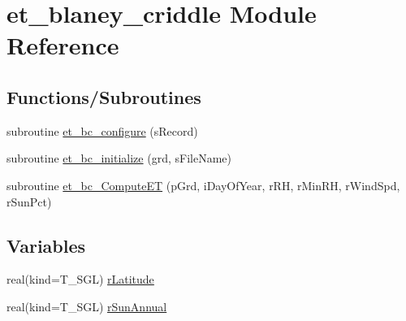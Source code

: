 \hypertarget{namespaceet__blaney__criddle}{
\section{et\_\-blaney\_\-criddle Module Reference}
\label{namespaceet__blaney__criddle}
}
\subsection*{Functions/Subroutines}
\begin{DoxyCompactItemize}
\item 
subroutine \hyperlink{namespaceet__blaney__criddle_a01ab00967e31dd22412693ce759baa17}{et\_\-bc\_\-configure} (sRecord)
\item 
subroutine \hyperlink{namespaceet__blaney__criddle_a44173fa4425711dfbec3af466c0bf584}{et\_\-bc\_\-initialize} (grd, sFileName)
\item 
subroutine \hyperlink{namespaceet__blaney__criddle_ae849a22107d6dfbdc4cf37bd66a15c25}{et\_\-bc\_\-ComputeET} (pGrd, iDayOfYear, rRH, rMinRH, rWindSpd, rSunPct)
\end{DoxyCompactItemize}
\subsection*{Variables}
\begin{DoxyCompactItemize}
\item 
real(kind=T\_\-SGL) \hyperlink{namespaceet__blaney__criddle_abf5bb3e13dbddedbfd78a519afe53b73}{rLatitude}
\item 
real(kind=T\_\-SGL) \hyperlink{namespaceet__blaney__criddle_a6cb99bb829eb26317eecf0d938c1f69a}{rSunAnnual}
\end{DoxyCompactItemize}


